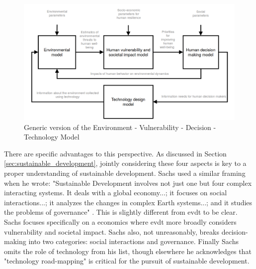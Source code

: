 \begin{figure}[!htb]
    \centering
    \includegraphics[scale=0.3]{Figures/chap3/modelflow.png}
    \caption[Generic version of EVDT Model] {Generic version of the Environment - Vulnerability - Decision - Technology Model}
    \label{fig:model}
\end{figure}

There are specific advantages to this perspective. As discussed in Section \ref{sec:sustainable_development}, jointly considering these four aspects is key to a proper understanding of sustainable development. Sachs used a similar framing when he wrote: "Sustainable Development involves not just one but four complex interacting systems. It deals with a global economy...; it focuses on social interactions...; it analyzes the changes in complex Earth systems...; and it studies the problems of governance" \cite{sachsAgeSustainableDevelopment2015}. This is slightly different from \ac{evdt} to be clear. Sachs focuses specifically on a economics where \ac{evdt} more broadly considers vulnerability and societal impact. Sachs also, not unreasonably, breaks decision-making into two categories: social interactions and governance. Finally Sachs omits the role of technology from his list, though elsewhere he acknowledges that "technology road-mapping" is critical for the pursuit of sustainable development.

